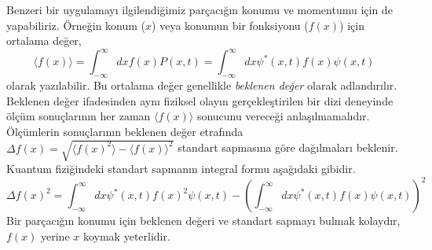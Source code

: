 \documentclass[a4paper,12pt, twoside]{article}
\begin{document}
Benzeri bir uygulamayı ilgilendiğimiz parçacığın konumu ve momentumu için de yapabiliriz. Örneğin konum ($x$) veya konumun bir fonksiyonu ($f(x)$) için ortalama değer,
\begin{equation}
\langle f(x) \rangle =\int ^{\infty }_{-\infty }dx f(x) P\left( x,t\right) =\int ^{\infty }_{-\infty }dx \psi^{\ast }\left(x,t\right) f(x) \psi \left( x,t\right)
\label{eq:expactation_value}
\end{equation}
olarak yazılabilir. Bu ortalama değer genellikle \emph{beklenen değer} olarak adlandırılır. Beklenen değer ifadesinden aynı fiziksel olayın gerçekleştirilen bir dizi deneyinde ölçüm sonuçlarının her zaman $\langle f(x) \rangle$ sonucunu vereceği anlaşılmamalıdır. Ölçümlerin sonuçlarının beklenen değer etrafında $\Delta f(x) = \sqrt{\langle f(x)^2 \rangle - \langle f(x) \rangle^2}$ standart sapmasına göre dağılmaları beklenir. Kuantum fiziğindeki standart sapmanın integral formu aşağıdaki gibidir.
\begin{equation}
\Delta f(x)^2 = \int ^{\infty }_{-\infty }dx \psi^{\ast }\left(x,t\right) f(x)^2 \psi \left( x,t\right) -\left( \int ^{\infty }_{-\infty }dx \psi^{\ast }\left(x,t\right) f(x) \psi \left( x,t\right)\right)^2
\end{equation}
Bir parçacığın konumu için beklenen değeri ve standart sapmayı bulmak kolaydır, $f(x)$ yerine $x$ koymak yeterlidir. 
\end{document}
